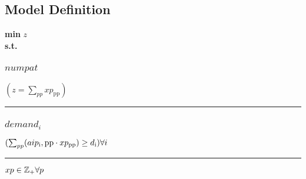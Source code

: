 \documentclass[11pt]{article}
\begin{document}
\subsection*{Model Definition}
\textbf{min} $z$\\
\textbf{s.t.}
\subsubsection*{$numpat$}
$
(z = \sum_{pp} xp_\text{pp})
$
\vspace{5pt}
\hrule
\subsubsection*{$demand_{i}$}
$
(\sum_{pp} (aip_\text{i},\text{pp} \cdot xp_\text{pp}) \geq d_\text{i})\hfill \forall i
$
\vspace{5pt}
\hrule
\bigskip
$xp\in \mathbb{Z}_{+} \forall p\\$
\end{document}
